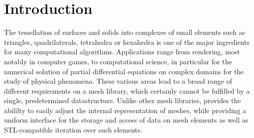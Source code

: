 
\chapter*{Introduction}    \label{intro}

The tessellation of surfaces and solids into complexes of small elements such as triangles, quadrilaterals, tetrahedra or hexahedra is one of the major
ingredients for many computational algorithms. Applications range from rendering, most notably in computer games, to computational science, in particular for the numerical solution of partial differential equations on complex domains for the study of physical phenomena. These various areas lead to a broad range of different requirements on a mesh library, which certainly cannot be fulfilled by a single, predetermined datastructure. Unlike other mesh libraries, {\ViennaGrid} provides the abililty to easily adjust the internal representation of meshes, while providing a uniform interface for the storage and access of data on mesh elements as well as STL-compatible iteration over such elements.

